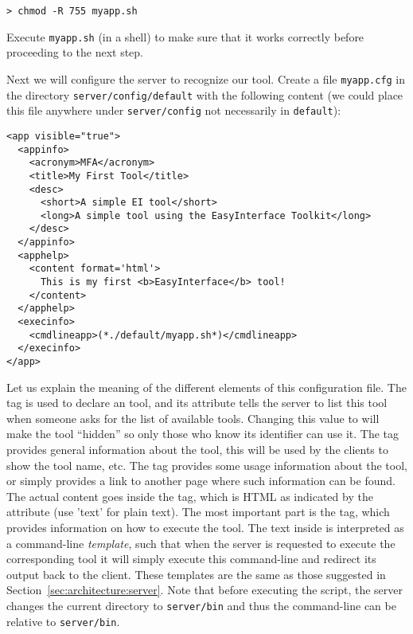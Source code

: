 \medskip
\begin{lstlisting}
> chmod -R 755 myapp.sh
\end{lstlisting}

\medskip
\noindent
Execute \texttt{myapp.sh} (in a shell) to make sure that it works
correctly before proceeding to the next step.

Next we will configure the server to recognize our tool.
%
Create a file \texttt{myapp.cfg} in the directory
\texttt{server/config/default} with the following content (we could
place this file anywhere under \texttt{server/config} not necessarily
in \texttt{default}):

\medskip
\begin{lstlisting}
<app visible="true">
  <appinfo>
    <acronym>MFA</acronym>
    <title>My First Tool</title>
    <desc>
      <short>A simple EI tool</short>
      <long>A simple tool using the EasyInterface Toolkit</long>
    </desc>
  </appinfo>
  <apphelp>
    <content format='html'>
      This is my first <b>EasyInterface</b> tool!
    </content>
  </apphelp>
  <execinfo>
    <cmdlineapp>(*./default/myapp.sh*)</cmdlineapp>
  </execinfo>
</app>
\end{lstlisting}

\medskip
\noindent
Let us explain the meaning of the different elements of this
configuration file.
%
The  tag is used to declare an \ei tool, and its
 attribute tells the server to list this tool when
someone asks for the list of available tools. Changing this value to
 will make the tool ``hidden'' so only those who
know its identifier can use it.
%
The  tag provides general information about the
tool, this will be used by the clients to show the tool
name, etc.
%
The  tag provides some usage information about the
tool, or simply provides a link to another page where such
information can be found. The actual content goes inside the
 tag, which is HTML as indicated by the 
attribute (use 'text' for plain text).
%
The most important part is the  tag, which provides
information on how to execute the tool. 
%
The text inside  is interpreted as a command-line
\emph{template}, such that when the server is requested to execute the
corresponding tool it will simply execute this command-line and
redirect its output back to the client. These templates are the same
as those suggested in Section~\ref{sec:architecture:server}.
%
Note that before executing the script, the server changes the current
directory to \texttt{server/bin} and thus the command-line can be
relative to \texttt{server/bin}.

